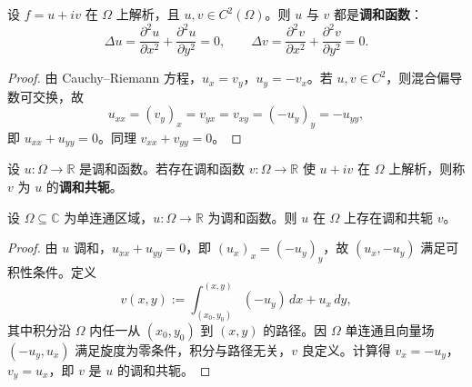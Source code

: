 \begin{theorem}[解析函数的实部与虚部是调和函数]\label{thm:ca_harmonic_parts}
设 $f = u + iv$ 在 $\Omega$ 上解析，且 $u, v \in C^2(\Omega)$。则 $u$ 与 $v$ 都是\textbf{调和函数}：
\[
\Delta u = \frac{\partial^2 u}{\partial x^2} + \frac{\partial^2 u}{\partial y^2} = 0, \qquad
\Delta v = \frac{\partial^2 v}{\partial x^2} + \frac{\partial^2 v}{\partial y^2} = 0.
\]
\end{theorem}

\begin{proof}
由 Cauchy--Riemann 方程，$u_x = v_y$，$u_y = -v_x$。若 $u, v \in C^2$，则混合偏导数可交换，故
\[
u_{xx} = (v_y)_x = v_{yx} = v_{xy} = (-u_y)_y = -u_{yy},
\]
即 $u_{xx} + u_{yy} = 0$。同理 $v_{xx} + v_{yy} = 0$。
\end{proof}

\begin{definition}[调和共轭]\label{def:ca_harmonic_conjugate}
设 $u: \Omega \to \mathbb{R}$ 是调和函数。若存在调和函数 $v: \Omega \to \mathbb{R}$ 使 $u + iv$ 在 $\Omega$ 上解析，则称 $v$ 为 $u$ 的\textbf{调和共轭}。
\end{definition}

\begin{proposition}[单连通区域上调和函数存在调和共轭]\label{prop:ca_harmonic_conjugate_existence}
设 $\Omega \subseteq \mathbb{C}$ 为单连通区域，$u: \Omega \to \mathbb{R}$ 为调和函数。则 $u$ 在 $\Omega$ 上存在调和共轭 $v$。
\end{proposition}

\begin{proof}
由 $u$ 调和，$u_{xx} + u_{yy} = 0$，即 $(u_x)_x = (-u_y)_y$，故 $(u_x, -u_y)$ 满足可积性条件。定义
\[
v(x, y) := \int_{(x_0, y_0)}^{(x, y)} (-u_y) \, dx + u_x \, dy,
\]
其中积分沿 $\Omega$ 内任一从 $(x_0, y_0)$ 到 $(x, y)$ 的路径。因 $\Omega$ 单连通且向量场 $(-u_y, u_x)$ 满足旋度为零条件，积分与路径无关，$v$ 良定义。计算得 $v_x = -u_y$，$v_y = u_x$，即 $v$ 是 $u$ 的调和共轭。
\end{proof}

